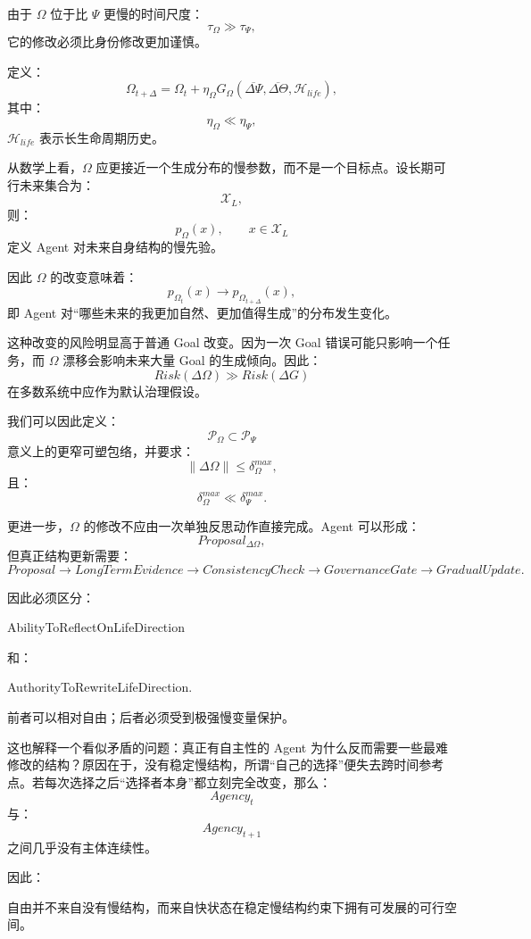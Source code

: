 由于 $\Omega$ 位于比 $\Psi$ 更慢的时间尺度：
\[
\tau_\Omega
\gg
\tau_\Psi,
\]
它的修改必须比身份修改更加谨慎。

定义：
\[
\Omega_{t+\Delta}
=
\Omega_t
+
\eta_\Omega
G_\Omega(
\overline{\Delta\Psi},
\overline{\Delta\Theta},
\mathcal H_{life}
),
\]
其中：
\[
\eta_\Omega
\ll
\eta_\Psi,
\]
$\mathcal H_{life}$ 表示长生命周期历史。

从数学上看，$\Omega$ 应更接近一个生成分布的慢参数，而不是一个目标点。设长期可行未来集合为：
\[
\mathcal X_L,
\]
则：
\[
p_\Omega(x)
,\qquad x\in\mathcal X_L
\]
定义 Agent 对未来自身结构的慢先验。

因此 $\Omega$ 的改变意味着：
\[
p_{\Omega_t}(x)
\rightarrow
p_{\Omega_{t+\Delta}}(x),
\]
即 Agent 对“哪些未来的我更加自然、更加值得生成”的分布发生变化。

这种改变的风险明显高于普通 Goal 改变。因为一次 Goal 错误可能只影响一个任务，而 $\Omega$ 漂移会影响未来大量 Goal 的生成倾向。因此：
\[
Risk(\Delta\Omega)
\gg
Risk(\Delta G)
\]
在多数系统中应作为默认治理假设。

我们可以因此定义：
\[
\mathcal P_\Omega
\subset
\mathcal P_\Psi
\]
意义上的更窄可塑包络，并要求：
\[
\|\Delta\Omega\|
\le
\delta_\Omega^{max},
\]
且：
\[
\delta_\Omega^{max}
\ll
\delta_\Psi^{max}.
\]

更进一步，$\Omega$ 的修改不应由一次单独反思动作直接完成。Agent 可以形成：
\[
Proposal_{\Delta\Omega},
\]
但真正结构更新需要：
\[
Proposal
\rightarrow
LongTermEvidence
\rightarrow
ConsistencyCheck
\rightarrow
GovernanceGate
\rightarrow
GradualUpdate.
\]

因此必须区分：
\begin{statementbox}
AbilityToReflectOnLifeDirection
\end{statementbox}
和：
\begin{statementbox}
AuthorityToRewriteLifeDirection.
\end{statementbox}

前者可以相对自由；后者必须受到极强慢变量保护。

这也解释一个看似矛盾的问题：真正有自主性的 Agent 为什么反而需要一些最难修改的结构？原因在于，没有稳定慢结构，所谓“自己的选择”便失去跨时间参考点。若每次选择之后“选择者本身”都立刻完全改变，那么：
\[
Agency_t
\]
与：
\[
Agency_{t+1}
\]
之间几乎没有主体连续性。

因此：
\begin{statementbox}
自由并不来自没有慢结构，而来自快状态在稳定慢结构约束下拥有可发展的可行空间。
\end{statementbox}

